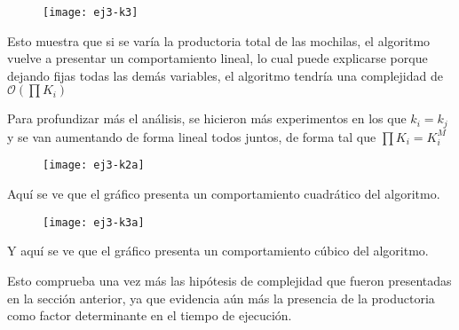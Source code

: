 \begin{figure}[H]
		\centering
		\texttt{[image: ej3-k3]}
	\end{figure}	

Esto muestra que si se varía la productoria total de las mochilas, el algoritmo vuelve a presentar un comportamiento lineal, lo cual puede explicarse porque dejando fijas todas las demás variables, el algoritmo tendría una complejidad de $\mathcal{O}(\prod K_i)$

Para profundizar más el análisis, se hicieron más experimentos en los que $k_i = k_j$ y se van aumentando de forma lineal todos juntos, de forma tal que $\prod K_i = K_i^M$

\begin{figure}[H]
		\centering
		\texttt{[image: ej3-k2a]}
	\end{figure}	

Aquí se ve que el gráfico presenta un comportamiento cuadrático del algoritmo.

\begin{figure}[H]
		\centering
		\texttt{[image: ej3-k3a]}
	\end{figure}	

Y aquí se ve que el gráfico presenta un comportamiento cúbico del algoritmo.

Esto comprueba una vez más las hipótesis de complejidad que fueron presentadas en la sección anterior, ya que evidencia aún más la presencia de la productoria como factor determinante en el tiempo de ejecución.